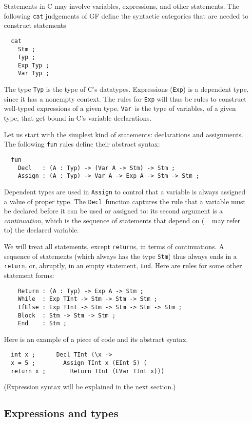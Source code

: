 \documentclass[12pt]{article}
\newcommand{\empha}[1]{{\em #1}}
\begin{document}
Statements in C may involve variables, expressions, and
other statements.
The following \texttt{cat} judgements of GF define the syntactic categories
that are needed to construct statements
\begin{verbatim}
  cat
    Stm ;
    Typ ;
    Exp Typ ;
    Var Typ ;
\end{verbatim}
The type \texttt{Typ} is the type of C's datatypes.
Expressions (\texttt{Exp}) is a dependent type, since it has a
nonempty context. The rules for \texttt{Exp}
will thus be rules to construct well-typed expressions of
a given type. \texttt{Var}\ is the type of variables,
of a given type, that get bound in C's variable
declarations.

Let us start with the simplest kind of statements:
declarations and assignments. The following \texttt{fun}
rules define their abstract syntax:
\begin{verbatim}
  fun
    Decl   : (A : Typ) -> (Var A -> Stm) -> Stm ;
    Assign : (A : Typ) -> Var A -> Exp A -> Stm -> Stm ;
\end{verbatim}
Dependent types are used in \texttt{Assign} to
control that a variable is always assigned a value of proper
type. The \texttt{Decl}\ function captures the rule that
a variable must be declared before it can be used or assigned to:
its second argument is a \empha{continuation}, which is
the sequence of statements that depend on (= may refer to)
the declared variable. 

We will treat all statements, except
\texttt{return}s, in terms of continuations. A sequence of
statements (which always has the type \texttt{Stm}) thus
always ends in a \texttt{return}, or, abruptly, in
an empty statement, \texttt{End}. Here are rules for some other
statement forms:
\begin{verbatim}
    Return : (A : Typ) -> Exp A -> Stm ;
    While  : Exp TInt -> Stm -> Stm -> Stm ;
    IfElse : Exp TInt -> Stm -> Stm -> Stm -> Stm ;
    Block  : Stm -> Stm -> Stm ;
    End    : Stm ;
\end{verbatim}
Here is an example of a piece of code and its abstract syntax.
\begin{verbatim}
  int x ;      Decl TInt (\x -> 
  x = 5 ;        Assign TInt x (EInt 5) (
  return x ;       Return TInt (EVar TInt x)))
\end{verbatim}
(Expression syntax will be explained in the next section.)



\subsection{Expressions and types}
\end{document}
